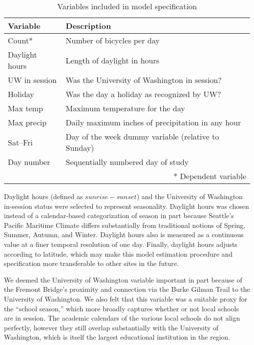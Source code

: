 \documentclass[12pt,letterpaper,article]{memoir} %
\begin{document}
\begin{centering}
\begin{table}[h]
\caption{Variables included in model specification}
\begin{tabular}{ll}
\toprule
Variable & Description \\
\midrule
Count* & Number of bicycles per day \\
Daylight hours & Length of daylight in hours \\
UW in session & Was the University of Washington in session? \\
Holiday & Was the day a holiday as recognized by UW? \\
Max temp & Maximum temperature for the day \\
Max precip & Daily maximum inches of precipitation in any hour \\
Sat--Fri & Day of the week dummy variable (relative to Sunday) \\
Day number & Sequentially numbered day of study \\
\bottomrule
\multicolumn{2}{r}{* Dependent variable}
\end{tabular}

\label{tb:variables}
\end{table}
\end{centering}

Daylight hours (defined as $sunrise - sunset$) and the University of
Washington in-session status were selected to represent seasonality.
Daylight hours was chosen instead of a calendar-based categorization
of season in part because Seattle's Pacific Maritime Climate differs
substantially from traditional notions of Spring, Summer, Autumn, and
Winter. Daylight hours also is measured as a continuous value at a
finer temporal resolution of one day. Finally, daylight hours adjusts
according to latitude, which may make this model estimation procedure
and specification more transferable to other sites in the future.

We deemed the University of Washington variable important in part
because of the Fremont Bridge's proximity and connection via the Burke
Gilman Trail to the University of Washington. We also felt that this
variable was a suitable proxy for the ``school season,'' which more
broadly captures whether or not local schools are in session. The
academic calendars of the various local schools do not align
perfectly, however they still overlap substantially with the
University of Washington, which is itself the largest educational
institution in the region.
\end{document}
